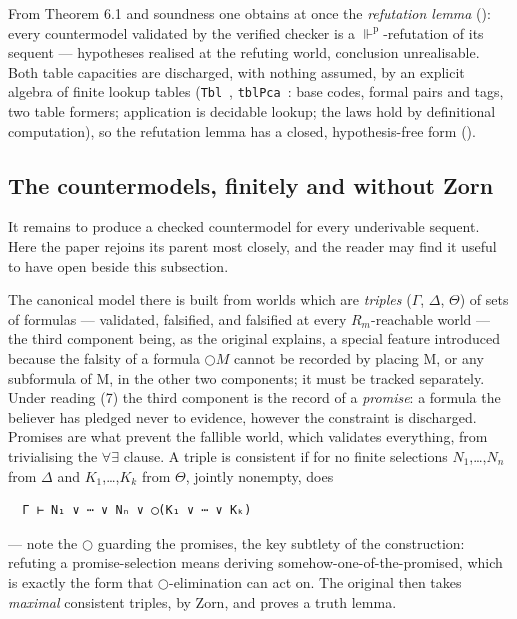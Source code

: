 From Theorem 6.1 and soundness one obtains at once the \emph{refutation
lemma} (): every countermodel validated by the verified
checker is a \ensuremath{\Vdash^{\mathrm{p}}}-refutation of its sequent --- hypotheses realised at the
refuting world, conclusion unrealisable. Both table capacities are
discharged, with nothing assumed, by an explicit algebra of finite
lookup tables (\texttt{Tbl}~, \texttt{tblPca}~: base codes, formal pairs and tags, two
table formers; application is decidable lookup; the laws hold by
definitional computation), so the refutation lemma has a closed, hypothesis-free
form ().

\subsection{The countermodels, finitely and without Zorn}\label{62-the-countermodels-finitely-and-without-zorn}

It remains to produce a checked countermodel for every underivable
sequent. Here the paper rejoins its parent most closely, and the reader
may find it useful to have \cite[\S4]{FairtloughMendler1997} open beside this subsection.

The canonical model there is built from worlds which are \emph{triples}
(\ensuremath{\Gamma}, \ensuremath{\Delta}, \ensuremath{\Theta}) of sets of formulas --- validated, falsified, and falsified at
every \ensuremath{R_{m}}-reachable world --- the third component being, as the original
explains, a special feature introduced because the falsity of a formula
\ensuremath{\bigcirc M} cannot be recorded by placing M, or any subformula of M, in the
other two components; it must be tracked separately. Under reading (7)
the third component is the record of a \emph{promise}: a formula the
believer has pledged never to evidence, however the constraint is
discharged. Promises are what prevent the fallible world, which
validates everything, from trivialising the \ensuremath{\forall\exists} clause. A triple is
consistent if for no finite selections \ensuremath{N_{1}},\ldots,\ensuremath{N_{n}} from \ensuremath{\Delta} and \ensuremath{K_{1}},\ldots,\ensuremath{K_{k}} from
\ensuremath{\Theta}, jointly nonempty, does

\begin{lstlisting}
  Γ ⊢ N₁ ∨ ⋯ ∨ Nₙ ∨ ◯(K₁ ∨ ⋯ ∨ Kₖ)
\end{lstlisting}

--- note the \ensuremath{\bigcirc} guarding the promises, the key subtlety of the
construction: refuting a promise-selection means deriving
somehow-one-of-the-promised, which is exactly the form that \ensuremath{\bigcirc}-elimination
can act on. The original then takes \emph{maximal}
consistent triples, by Zorn, and proves a truth lemma.

